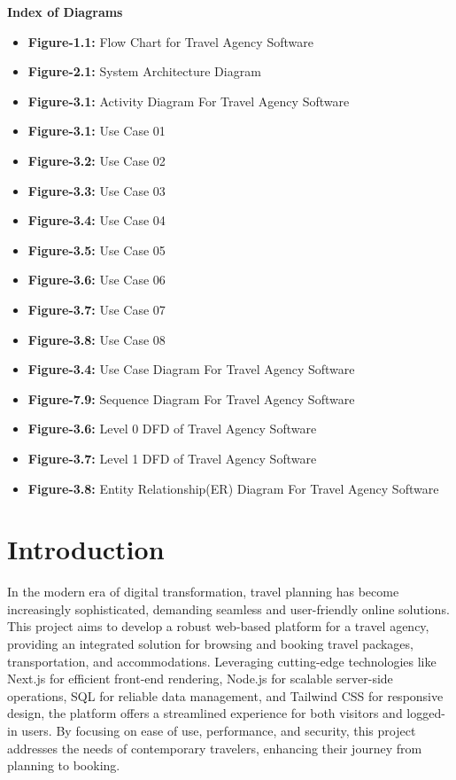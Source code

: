 \documentclass{scrreprt}
\begin{document}
\tableofcontents
\begin{center}
    \parbox{0.8\textwidth}{ 
        \centering
        \textbf{Index of Diagrams}
        
        \begin{itemize}
            \item \textbf{Figure-1.1:} Flow Chart for Travel Agency Software 
            \item \textbf{Figure-2.1:} System Architecture Diagram 
            \item \textbf{Figure-3.1:} Activity Diagram For Travel Agency Software 
            \item \textbf{Figure-3.1:} Use Case 01 
            \item \textbf{Figure-3.2:} Use Case 02 
            \item \textbf{Figure-3.3:} Use Case 03 
            \item \textbf{Figure-3.4:} Use Case 04 
            \item \textbf{Figure-3.5:} Use Case 05 
            \item \textbf{Figure-3.6:} Use Case 06 
            \item \textbf{Figure-3.7:} Use Case 07 
            \item \textbf{Figure-3.8:} Use Case 08 
            \item \textbf{Figure-3.4:} Use Case Diagram For Travel Agency Software 
            \item \textbf{Figure-7.9:} Sequence Diagram For Travel Agency Software 
            \item \textbf{Figure-3.6:} Level 0 DFD of Travel Agency Software 
            \item \textbf{Figure-3.7:} Level 1 DFD of Travel Agency Software 
            \item \textbf{Figure-3.8:} Entity Relationship(ER) Diagram For Travel Agency Software 
        \end{itemize}
    }
\end{center}

\chapter{Introduction}
In the modern era of digital transformation, travel planning has become increasingly sophisticated, demanding seamless and user-friendly online solutions. This project aims to develop a robust web-based platform for a travel agency, providing an integrated solution for browsing and booking travel packages, transportation, and accommodations. Leveraging cutting-edge technologies like Next.js for efficient front-end rendering, Node.js for scalable server-side operations, SQL for reliable data management, and Tailwind CSS for responsive design, the platform offers a streamlined experience for both visitors and logged-in users. By focusing on ease of use, performance, and security, this project addresses the needs of contemporary travelers, enhancing their journey from planning to booking.
\end{document}

